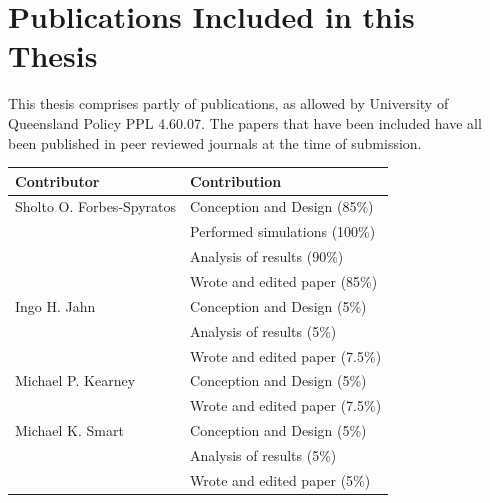 \clearpage
\section*{Publications Included in this Thesis}

This thesis comprises partly of publications, as allowed by University of Queensland Policy PPL 4.60.07. The papers that have been included have all been published in peer reviewed journals at the time of submission. 

\vspace{\baselineskip}
\noindent
{}

\begin{center}
  \begin{tabular}{ll}
    \toprule
    Contributor   & Contribution \\
    \midrule
    Sholto O. Forbes-Spyratos             
                                  & Conception and Design (85\%)\\
                                  & Performed simulations (100\%)\\
                                  & Analysis of results (90\%)\\
                                  & Wrote and edited paper (85\%)\\
    \midrule
    Ingo H. Jahn            
                                  & Conception and Design (5\%)\\
                                  & Analysis of results (5\%)\\
                                  & Wrote and edited paper (7.5\%)\\
                                  
        \midrule
        Michael P. Kearney            
								      & Conception and Design (5\%)\\
								      & Wrote and edited paper (7.5\%)\\                       

    \midrule
    Michael K. Smart              
                                  & Conception and Design (5\%)\\
                                  & Analysis of results (5\%)\\
                                  & Wrote and edited paper (5\%)\\
    \bottomrule
  \end{tabular}
\end{center}

